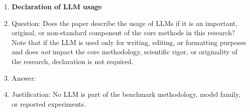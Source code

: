 \begin{enumerate}
\item {\bf Declaration of LLM usage}
    \item[] Question: Does the paper describe the usage of LLMs if it is an important, original, or non-standard component of the core methods in this research? Note that if the LLM is used only for writing, editing, or formatting purposes and does \emph{not} impact the core methodology, scientific rigor, or originality of the research, declaration is not required.
    \item[] Answer: \answerNA{}
    \item[] Justification: No LLM is part of the benchmark methodology, model family, or reported experiments.

\end{enumerate}

